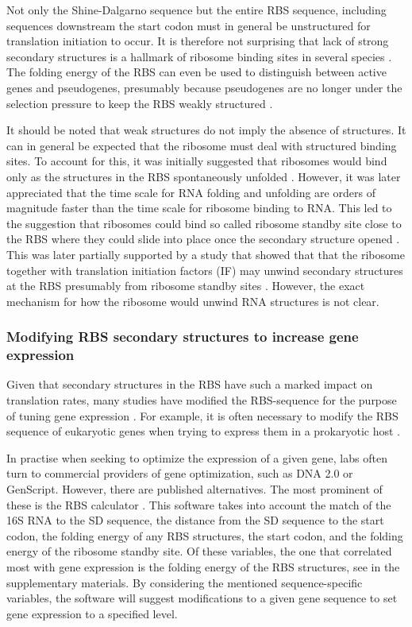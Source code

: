 Not only the Shine-Dalgarno sequence but the entire RBS sequence, including
sequences downstream the start codon \cite{seo_quantitative_2009} must in
general be unstructured for translation initiation to occur. It is therefore not
surprising that lack of strong secondary structures is a hallmark of ribosome
binding sites in several species \cite{gu_universal_2010}. The folding energy
of the RBS can even be used to distinguish between active genes and
pseudogenes, presumably because pseudogenes are no longer under the selection
pressure to keep the RBS weakly structured \cite{keller_reduced_2012}.

It should be noted that weak structures do not imply the absence of structures.
It can in general be expected that the ribosome must deal with structured
binding sites. To account for this, it was initially suggested that ribosomes
would bind only as the structures in the RBS spontaneously unfolded
\cite{de_smit_translational_1994}. However, it was later appreciated that the
time scale for RNA folding and unfolding are orders of magnitude faster than
the time scale for ribosome binding to RNA. This led to the suggestion that
ribosomes could bind so called ribosome standby site close to the RBS where
they could slide into place once the secondary structure opened
\cite{de_smit_translational_2003-1}. This was later partially supported by a
study that showed that that the ribosome together with translation initiation
factors (IF) may unwind secondary structures at the RBS presumably from
ribosome standby sites \cite{studer_unfolding_2006}. However, the exact
mechanism for how the ribosome would unwind RNA structures is not clear.

\subsubsection{Modifying RBS secondary structures to increase gene expression}
Given that secondary structures in the RBS have such a marked impact on
translation rates, many studies have modified the RBS-sequence for the purpose
of tuning gene expression \cite{cebe_rapid_2006, park_design_2007,
berg_expression_2009}. For example, it is often necessary to modify the RBS
sequence of eukaryotic genes when trying to express them in a prokaryotic host
\cite{care_translation_2007}.

In practise when seeking to optimize the expression of a given gene, labs often
turn to commercial providers of gene optimization, such as DNA 2.0 or
GenScript.  However, there are published alternatives. The most prominent of
these is the RBS calculator \cite{salis_automated_2009}. This software takes
into account the match of the 16S RNA to the SD sequence, the distance from the
SD sequence to the start codon, the folding energy of any RBS structures, the
start codon, and the folding energy of the ribosome standby site. Of these
variables, the one that correlated most with gene expression is the folding
energy of the RBS structures, see \cite{salis_automated_2009} in the
supplementary materials. By considering the mentioned sequence-specific
variables, the software will suggest modifications to a given gene sequence to
set gene expression to a specified level.

